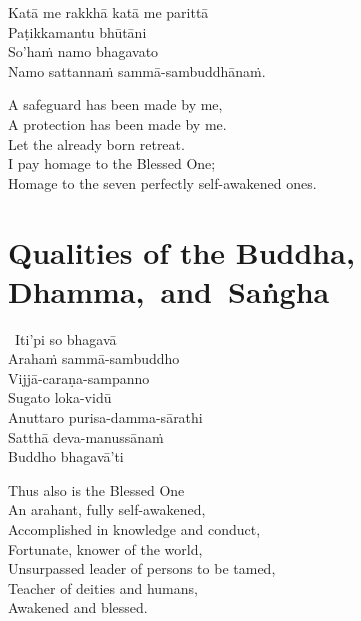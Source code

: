 \ifbfive\clearpage\fi

\begin{pali-hang-continued}
  Katā me rakkhā katā me parittā\\
  Paṭikkamantu bhūtāni\\
  So'haṁ namo bhagavato\\
  Namo sattannaṁ sammā-sambuddhānaṁ.
\end{pali-hang-continued}

\ifafive\clearpage\fi

\begin{english-verses}
  A safeguard has been made by me,\\
  A protection has been made by me.\\
  Let the already born retreat.\\
  I pay homage to the Blessed One;\\
  Homage to the seven perfectly self-awakened ones.
\end{english-verses}

\suttaRef{[AN 4.67]}



\section{Qualities of the Buddha, \mbox{Dhamma,}~and~Saṅgha}
\label{qualities-of-buddha-dhamma-sangha}

\begin{pali-hang}
  \anglebracketleft\ \hspace{-0.5mm}Iti'pi so bhagavā \hspace{-0.5mm}\anglebracketright\ \\
  Arahaṁ sammā-sambuddho\\
  Vijjā-caraṇa-sampanno\\
  Sugato loka-vidū\\
  Anuttaro purisa-damma-sārathi\\
  Satthā deva-manussānaṁ\\
  Buddho bhagavā'ti
\end{pali-hang}

\begin{english-verses}
  Thus also is the Blessed One\\
  An arahant, fully self-awakened,\\
  Accomplished in knowledge and conduct,\\
  Fortunate, knower of the world,\\
  Unsurpassed leader of persons to be tamed,\\
  Teacher of deities and humans,\\
  Awakened and blessed.
\end{english-verses}


